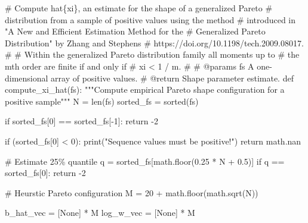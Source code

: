 \documentclass[
  letterpaper,
  DIV=11,
  numbers=noendperiod]{scrartcl}
\newenvironment{Shaded}{\begin{snugshade}}{\end{snugshade}}
\newcommand{\BuiltInTok}[1]{\textcolor[rgb]{0.00,0.23,0.31}{#1}}
\newcommand{\CommentTok}[1]{\textcolor[rgb]{0.37,0.37,0.37}{#1}}
\newcommand{\ControlFlowTok}[1]{\textcolor[rgb]{0.00,0.23,0.31}{#1}}
\newcommand{\DecValTok}[1]{\textcolor[rgb]{0.68,0.00,0.00}{#1}}
\newcommand{\FloatTok}[1]{\textcolor[rgb]{0.68,0.00,0.00}{#1}}
\newcommand{\KeywordTok}[1]{\textcolor[rgb]{0.00,0.23,0.31}{#1}}
\newcommand{\NormalTok}[1]{\textcolor[rgb]{0.00,0.23,0.31}{#1}}
\newcommand{\OperatorTok}[1]{\textcolor[rgb]{0.37,0.37,0.37}{#1}}
\newcommand{\StringTok}[1]{\textcolor[rgb]{0.13,0.47,0.30}{#1}}
\newcommand{\VariableTok}[1]{\textcolor[rgb]{0.07,0.07,0.07}{#1}}
\begin{document}
\begin{Shaded}
\begin{Highlighting}[]
\CommentTok{\# Compute hat\{xi\}, an estimate for the shape of a generalized Pareto}
\CommentTok{\# distribution from a sample of positive values using the method}
\CommentTok{\# introduced in "A New and Efficient Estimation Method for the}
\CommentTok{\# Generalized Pareto Distribution" by Zhang and Stephens}
\CommentTok{\# https://doi.org/10.1198/tech.2009.08017.}
\CommentTok{\#}
\CommentTok{\# Within the generalized Pareto distribution family all moments up to}
\CommentTok{\# the mth order are finite if and only if}
\CommentTok{\#  xi \textless{} 1 / m.}
\CommentTok{\#}
\CommentTok{\# @params fs A one{-}dimensional array of positive values.}
\CommentTok{\# @return Shape parameter estimate.}
\KeywordTok{def}\NormalTok{ compute\_xi\_hat(fs):}
  \CommentTok{"""Compute empirical Pareto shape configuration for a positive sample"""}
\NormalTok{  N }\OperatorTok{=} \BuiltInTok{len}\NormalTok{(fs)}
\NormalTok{  sorted\_fs }\OperatorTok{=} \BuiltInTok{sorted}\NormalTok{(fs)}
  
  \ControlFlowTok{if}\NormalTok{ sorted\_fs[}\DecValTok{0}\NormalTok{] }\OperatorTok{==}\NormalTok{ sorted\_fs[}\OperatorTok{{-}}\DecValTok{1}\NormalTok{]:}
    \ControlFlowTok{return} \OperatorTok{{-}}\DecValTok{2}
  
  \ControlFlowTok{if}\NormalTok{ (sorted\_fs[}\DecValTok{0}\NormalTok{] }\OperatorTok{\textless{}} \DecValTok{0}\NormalTok{):}
    \BuiltInTok{print}\NormalTok{(}\StringTok{"Sequence values must be positive!"}\NormalTok{)}
    \ControlFlowTok{return}\NormalTok{ math.nan}
  
  \CommentTok{\# Estimate 25\% quantile}
\NormalTok{  q }\OperatorTok{=}\NormalTok{ sorted\_fs[math.floor(}\FloatTok{0.25} \OperatorTok{*}\NormalTok{ N }\OperatorTok{+} \FloatTok{0.5}\NormalTok{)]}
  \ControlFlowTok{if}\NormalTok{ q }\OperatorTok{==}\NormalTok{ sorted\_fs[}\DecValTok{0}\NormalTok{]:}
    \ControlFlowTok{return} \OperatorTok{{-}}\DecValTok{2}
    
  \CommentTok{\# Heurstic Pareto configuration}
\NormalTok{  M }\OperatorTok{=} \DecValTok{20} \OperatorTok{+}\NormalTok{ math.floor(math.sqrt(N))}
  
\NormalTok{  b\_hat\_vec }\OperatorTok{=}\NormalTok{ [}\VariableTok{None}\NormalTok{] }\OperatorTok{*}\NormalTok{ M}
\NormalTok{  log\_w\_vec }\OperatorTok{=}\NormalTok{ [}\VariableTok{None}\NormalTok{] }\OperatorTok{*}\NormalTok{ M}
  

\end{Highlighting}
\end{Shaded}
\end{document}
